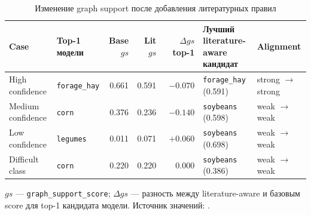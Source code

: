 \begin{table}[H]
\centering
\scriptsize
\caption{Изменение graph support после добавления литературных правил}
\label{tab:literature-effect}
\setlength{\tabcolsep}{2pt}
\begin{tabular}{@{}>{\raggedright\arraybackslash}p{}
                >{\raggedright\arraybackslash}p{}
                r
                r
                r
                >{\raggedright\arraybackslash}p{}
                >{\raggedright\arraybackslash}p{}@{}}
\toprule
Case & Top-1 модели & \makecell[r]{Base\\$gs$} & \makecell[r]{Lit\\$gs$} & \makecell[r]{$\Delta gs$\\top-1}
    & \makecell[l]{Лучший literature-aware\\кандидат} & Alignment \\
\midrule
High confidence
  & \texttt{forage\_hay}
  & 0.661
  & 0.591
  & $-0.070$
  & \texttt{forage\_hay} (0.591)
  & strong $\rightarrow$ strong \\
Medium confidence
  & \texttt{corn}
  & 0.376
  & 0.236
  & $-0.140$
  & \texttt{soybeans} (0.598)
  & weak $\rightarrow$ weak \\
Low confidence
  & \texttt{legumes}
  & 0.011
  & 0.071
  & $+0.060$
  & \texttt{soybeans} (0.698)
  & weak $\rightarrow$ weak \\
Difficult class
  & \texttt{corn}
  & 0.220
  & 0.220
  & $\phantom{+}0.000$
  & \texttt{soybeans} (0.386)
  & weak $\rightarrow$ weak \\
\bottomrule
\end{tabular}

\vspace{0.4em}
\footnotesize $gs$ --- \texttt{graph\_support\_score}; $\Delta gs$ --- разность между literature-aware и базовым score
для top-1 кандидата модели.
Источник значений: .
\normalsize
\end{table}
